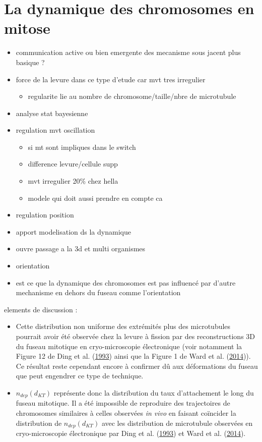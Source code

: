 \documentclass[12pt,a4paper,twoside,openright]{book}
\providecommand{\tightlist}{%
  \setlength{\itemsep}{0pt}\setlength{\parskip}{0pt}}
\begin{document}
\section{La dynamique des chromosomes en
mitose}\label{la-dynamique-des-chromosomes-en-mitose}

\begin{itemize}
\item
  communication active ou bien emergente des mecanisme sous jacent plus
  basique ?
\item
  force de la levure dans ce type d'etude car mvt tres irregulier

  \begin{itemize}
  \tightlist
  \item
    regularite lie au nombre de chromosome/taille/nbre de microtubule
  \end{itemize}
\item
  analyse stat bayesienne
\item
  regulation mvt oscillation

  \begin{itemize}
  \tightlist
  \item
    si mt sont impliques dans le switch
  \item
    difference levure/cellule supp
  \item
    mvt irregulier 20\% chez hella
  \item
    modele qui doit aussi prendre en compte ca
  \end{itemize}
\item
  regulation position
\item
  apport modelisation ds la dynamique
\item
  ouvre passage a la 3d et multi organismes
\item
  orientation
\item
  est ce que la dynamique des chromosomes est pas influencé par d'autre
  mechanisme en dehors du fuseau comme l'orientation
\end{itemize}

elements de discussion :

\begin{itemize}
\item
  Cette distribution non uniforme des extrémités plus des microtubules
  pourrait avoir été observée chez la levure à fission par des
  reconstructions 3D du fuseau mitotique en cryo-microscopie
  électronique (voir notamment la Figure 12 de Ding et al.
  (\hyperref[ref-Ding1993a]{1993}) ainsi que la Figure 1 de Ward et al.
  (\hyperref[ref-Ward2014]{2014})). Ce résultat reste cependant encore à
  confirmer dû aux déformations du fuseau que peut engendrer ce type de
  technique.
\item
  \(n_{dep}(d_{KT})\) représente donc la distribution du taux
  d'attachement le long du fuseau mitotique. Il a été impossible de
  reproduire des trajectoires de chromosomes similaires à celles
  observées \emph{in vivo} en faisant coïncider la distribution de
  \(n_{dep}(d_{KT})\) avec les distribution de microtubule observées en
  cryo-microscopie électronique par Ding et al.
  (\hyperref[ref-Ding1993a]{1993}) et Ward et al.
  (\hyperref[ref-Ward2014]{2014}).
\end{itemize}
\end{document}
